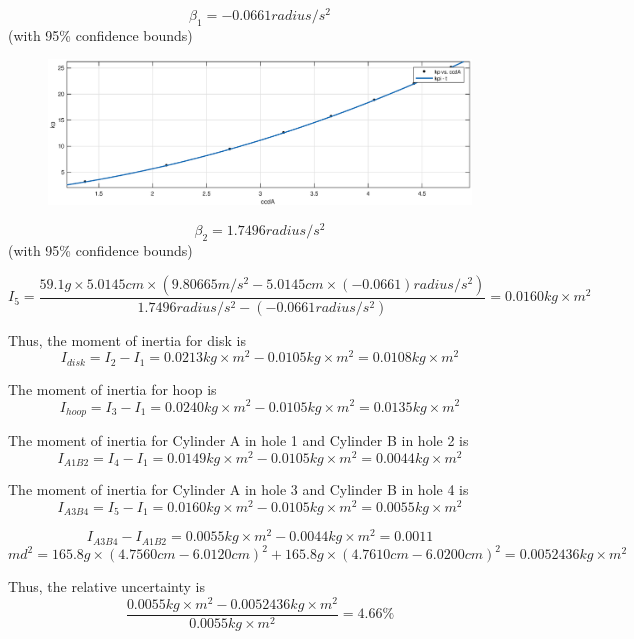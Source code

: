 $$ \beta_1 = -0.0661 radius/s^2$$ (with 95\% confidence bounds) 

\begin{figure}[H]
\centering
\includegraphics[width=\EFWwr]{matlab/ccda}
\end{figure}

$$ \beta_2 = 1.7496 radius/s^2$$ (with 95\% confidence bounds) 


$$ I_5 = \frac{59.1 g \times 5.0145 cm \times (9.80665 m/s^2 - 5.0145 cm \times (-0.0661) radius/s^2 )}{ 1.7496 radius/s^2 -(-0.0661 radius/s^2) } = 0.0160 kg\times m^2 $$

Thus, the moment of inertia for disk is 
$$ I_{disk} = I_2 - I_1 = 0.0213  kg\times m^2 - 0.0105 kg\times m^2 =  0.0108  kg\times m^2 $$

The moment of inertia for hoop is 
$$ I_{hoop} = I_3 - I_1 = 0.0240  kg\times m^2 - 0.0105 kg\times m^2 =  0.0135  kg\times m^2 $$

The moment of inertia for Cylinder A in hole 1 and Cylinder B in hole 2 is 
$$ I_{A1B2} = I_4 - I_1 = 0.0149  kg\times m^2 - 0.0105 kg\times m^2 =  0.0044  kg\times m^2 $$

The moment of inertia for Cylinder A in hole 3 and Cylinder B in hole 4 is 
$$ I_{A3B4} = I_5 - I_1 = 0.0160  kg\times m^2 - 0.0105 kg\times m^2 =  0.0055  kg\times m^2 $$

$$ I_{A3B4} -I_{A1B2} =0.0055  kg\times m^2 -   0.0044  kg\times m^2 = 0.0011 $$
$$ md^2 =  165.8 g \times  (4.7560 cm - 6.0120cm )^2 + 165.8 g \times  (4.7610 cm - 6.0200cm )^2  = 0.0052436 kg\times m^2 $$

Thus, the relative uncertainty is $$ \frac{ 0.0055  kg\times m^2 - 0.0052436 kg \times m^2}{0.0055  kg\times m^2} = 4.66 \% $$